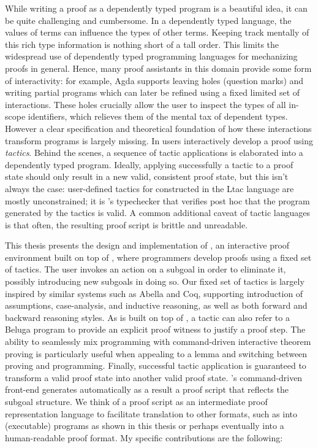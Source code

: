 While writing a proof as a dependently typed program is a beautiful idea, it
can be quite challenging and cumbersome.
In a dependently typed language, the values of terms can influence the types of
other terms.
Keeping track mentally of this rich type information is nothing short of a tall
order.
This limits the widespread use of dependently typed programming languages for
mechanizing proofs in general.
Hence, many proof assistants in this domain provide some form
of interactivity: for example, Agda \cite{Norell:phd07} supports leaving holes
(question marks) and writing partial programs which can later be refined using a
fixed limited set of interactions.
These holes crucially allow the user to inspect the types of all in-scope
identifiers, which relieves them of the mental tax of dependent types.
However a clear specification and theoretical foundation of how these
interactions transform programs is largely missing.
In \Coq{} \cite{bertot/casteran:2004} users interactively develop a proof using
\emph{tactics}.
Behind the scenes, a sequence of tactic applications is elaborated into a
dependently typed program.
Ideally, applying successfully a tactic to a proof state should only result in a
new valid, consistent proof state, but this isn't always the case: user-defined
tactics for \Coq{} constructed in the Ltac language \cite{Delahaye:LPAR00} are
mostly unconstrained; it is \Coq's typechecker that verifies post hoc that the
program generated by the tactics is valid.
A common additional caveat of tactic languages is that often, the resulting
proof script is brittle and unreadable.

This thesis presents the design and implementation of \Harpoon, an
interactive proof environment built on top of \Beluga, where programmers develop
proofs using a fixed set of tactics.
The user invokes an action on a subgoal in order to eliminate it, possibly
introducing new subgoals in doing so.
Our fixed set of tactics is largely inspired by similar systems such as
Abella \cite{Gacek:IJCAR08} and Coq, supporting introduction of assumptions,
case-analysis, and inductive reasoning, as well as both forward and backward
reasoning styles.
As \Harpoon{} is built on top of \Beluga{}, a tactic can also refer to a
Beluga{} program to provide an explicit proof witness to justify a proof step.
The ability to seamlessly mix programming with command-driven interactive
theorem proving is particularly useful when appealing to a lemma and switching
between proving and programming.
Finally, successful tactic application is guaranteed to transform a valid proof
state into another valid proof state.
%
\Harpoon's command-driven front-end generates automatically as a result a proof
script that reflects the subgoal structure.
We think of a proof script as an intermediate proof representation language to
facilitate translation to other formats, such as into (executable) \Beluga{}
programs as shown in this thesis or perhaps eventually into a human-readable
proof format. My specific contributions are the following:

